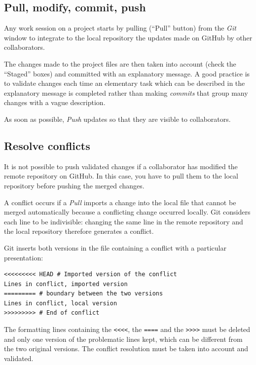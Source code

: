 \documentclass[
  12pt,
  american,
  a4paper,
  extrafontsizes,onecolumn,openright
  ]{memoir}
\begin{document}
\subsection{Pull, modify, commit, push}\label{pull-modify-commit-push}

Any work session on a project starts by pulling (\enquote{Pull} button) from the \emph{Git} window to integrate to the local repository the updates made on GitHub by other collaborators.

The changes made to the project files are then taken into account (check the \enquote{Staged} boxes) and committed with an explanatory message.
A good practice is to validate changes each time an elementary task which can be described in the explanatory message is completed rather than making \emph{commits} that group many changes with a vague description.

As soon as possible, \emph{Push} updates so that they are visible to collaborators.

\subsection{Resolve conflicts}\label{resolve-conflicts}

It is not possible to push validated changes if a collaborator has modified the remote repository on GitHub.
In this case, you have to pull them to the local repository before pushing the merged changes.

A conflict occurs if a \emph{Pull} imports a change into the local file that cannot be merged automatically because a conflicting change occurred locally.
Git considers each line to be indivisible: changing the same line in the remote repository and the local repository therefore generates a conflict.

Git inserts both versions in the file containing a conflict with a particular presentation:

\begin{verbatim}
<<<<<<<<< HEAD # Imported version of the conflict
Lines in conflict, imported version
========= # boundary between the two versions
Lines in conflict, local version
>>>>>>>>> # End of conflict
\end{verbatim}

The formatting lines containing the \texttt{\textless{}\textless{}\textless{}\textless{}}, the \texttt{====} and the \texttt{\textgreater{}\textgreater{}\textgreater{}\textgreater{}} must be deleted and only one version of the problematic lines kept, which can be different from the two original versions.
The conflict resolution must be taken into account and validated.
\end{document}

